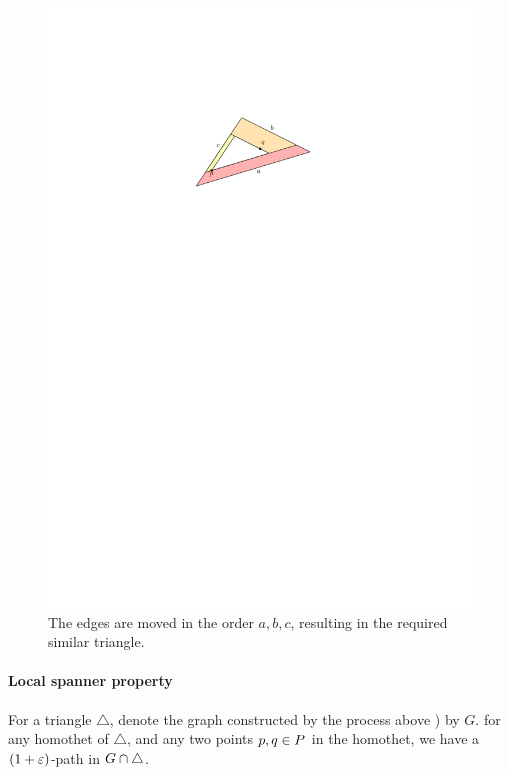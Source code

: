 \documentclass[12pt]{article}%
\begin{document}
\begin{figure}[h]
    \centering \includegraphics{figs/shrink_tri}
    \caption{The edges are moved in the order $a,b,c$, resulting in
       the required similar triangle.}
\end{figure}



\paragraph{Local spanner property}
\begin{lemma}
    For a triangle $\triangle$, denote the graph constructed by the
    process above ) by $G$. for any homothet
    of $\triangle$, and any two points $p, q \in P$ in the
    homothet, we have a $(1+\varepsilon)$-path in
    $G \cap {\triangle}$.
\end{lemma}
\end{document}
